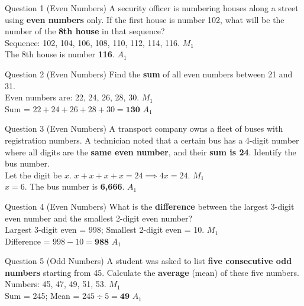 \documentclass[12pt, a4paper, oneside]{article}
\begin{document}
\begin{solvingbox}{Question 1 (Even Numbers)}
A security officer is numbering houses along a street using \textbf{even numbers} only. If the first house is number 102, what will be the number of the \textbf{8th house} in that sequence? \\
Sequence: 102, 104, 106, 108, 110, 112, 114, 116. \hfill $M_1$ \\
The 8th house is number \textbf{116}. \hfill $A_1$
\end{solvingbox}

\begin{solvingbox}{Question 2 (Even Numbers)}
Find the \textbf{sum} of all even numbers between 21 and 31. \\
Even numbers are: 22, 24, 26, 28, 30. \hfill $M_1$ \\
Sum = $22 + 24 + 26 + 28 + 30 = \mathbf{130}$ \hfill $A_1$
\end{solvingbox}

\begin{solvingbox}{Question 3 (Even Numbers)}
A transport company owns a fleet of buses with registration numbers. A technician noted that a certain bus has a 4-digit number where all digits are the \textbf{same even number}, and their \textbf{sum is 24}. Identify the bus number. \\
Let the digit be $x$. $x + x + x + x = 24 \implies 4x = 24$. \hfill $M_1$ \\
$x = 6$. The bus number is \textbf{6,666}. \hfill $A_1$
\end{solvingbox}

\begin{solvingbox}{Question 4 (Even Numbers)}
What is the \textbf{difference} between the largest 3-digit even number and the smallest 2-digit even number? \\
Largest 3-digit even = 998; Smallest 2-digit even = 10. \hfill $M_1$ \\
Difference = $998 - 10 = \mathbf{988}$ \hfill $A_1$
\end{solvingbox}


\begin{solvingbox}{Question 5 (Odd Numbers)}
A student was asked to list \textbf{five consecutive odd numbers} starting from 45. Calculate the \textbf{average} (mean) of these five numbers. \\
Numbers: 45, 47, 49, 51, 53. \hfill $M_1$ \\
Sum = 245; Mean = $245 \div 5 = \mathbf{49}$ \hfill $A_1$
\end{solvingbox}
\end{document}
